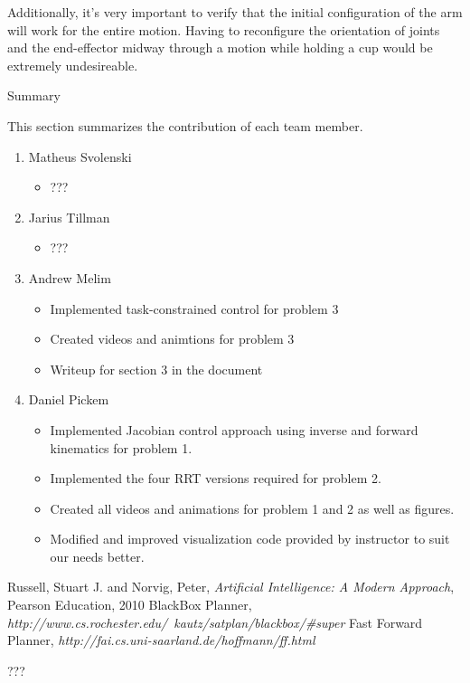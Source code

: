 \documentclass[12pt]{article}
\begin{document}
Additionally, it's very important to verify that the initial configuration of the arm will work for the entire motion. Having to reconfigure the orientation of joints and the end-effector midway through a motion while holding a cup would be extremely undesireable.

\newpage
\begin{center}
\Huge{Summary} 
\end{center}
This section summarizes the contribution of each team member. 

\begin{enumerate}
  \item Matheus Svolenski
    \begin{itemize}
     \item ???
    \end{itemize}

  \item Jarius Tillman
   \begin{itemize}
     \item ???
    \end{itemize}
  \item Andrew Melim
    \begin{itemize}
     \item Implemented task-constrained control for problem 3
     \item Created videos and animtions for problem 3
     \item Writeup for section 3 in the document
    \end{itemize}

  \item Daniel Pickem
    \begin{itemize}
     \item Implemented Jacobian control approach using inverse and forward kinematics for problem 1.
     \item Implemented the four RRT versions required for problem 2.
     \item Created all videos and animations for problem 1 and 2 as well as figures.
     \item Modified and improved visualization code provided by instructor to suit our needs better. 
    \end{itemize}
\end{enumerate}

\begin{thebibliography}{50}
   Russell, Stuart J. and Norvig, Peter, \textsl{Artificial Intelligence: A Modern Approach}, Pearson Education, 2010
   BlackBox Planner, \textsl{http://www.cs.rochester.edu/~kautz/satplan/blackbox/\#super}
   Fast Forward Planner, \textsl{http://fai.cs.uni-saarland.de/hoffmann/ff.html}
\end{thebibliography}

\newpage
\begin{appendix}
???
\end{appendix}

\newpage
\end{document}
